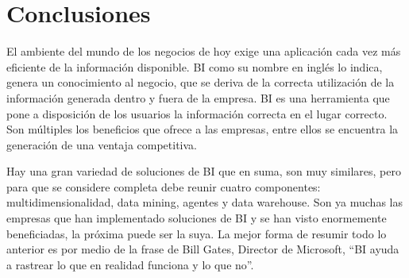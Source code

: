 \section{Conclusiones}

El ambiente del mundo de los negocios de hoy exige una aplicación cada vez más eficiente de la información disponible. BI como su nombre en inglés lo indica, genera un conocimiento al negocio, que se deriva de la correcta utilización de la información generada dentro y fuera de la empresa. BI es una herramienta que pone a disposición de los usuarios la información correcta en el lugar correcto. Son múltiples los beneficios que ofrece a las empresas, entre ellos se encuentra la generación de una ventaja competitiva.\newline

Hay una gran variedad de soluciones de BI que en suma, son muy similares, pero para que se considere completa debe reunir cuatro componentes: multidimensionalidad, data mining, agentes y data warehouse. Son ya muchas las empresas que han implementado soluciones de BI y se han visto enormemente beneficiadas, la próxima puede ser la suya. La mejor forma de resumir todo lo anterior es por medio de la frase de Bill Gates, Director de Microsoft, “BI ayuda a rastrear lo que en realidad funciona y lo que no”.